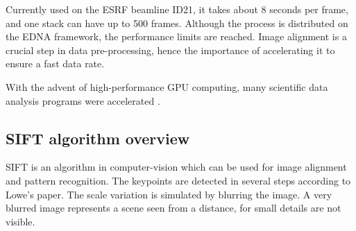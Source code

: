 \documentclass[preprint]{iucr}
\begin{document}
Currently used on the ESRF beamline ID21, it takes about 8 seconds per frame, and one stack can have up to 500 frames. Although the process is distributed on the EDNA\cite{edna} framework, the performance limits are reached. Image alignment is a crucial step in data pre-processing, hence the importance of accelerating it to ensure a fast data rate.

With the advent of high-performance GPU computing, many scientific data analysis programs were accelerated \cite{pyhst,pyfai,Favre-Nicolin}. %

\subsection{SIFT algorithm overview}
SIFT is an algorithm in computer-vision which can be used for image alignment and pattern recognition. The keypoints are detected in several steps according to Lowe's paper\cite{Lowe99}.
The scale variation is simulated by blurring the image. A very blurred image represents a scene seen from a distance, for small details are not visible. 
\end{document}

